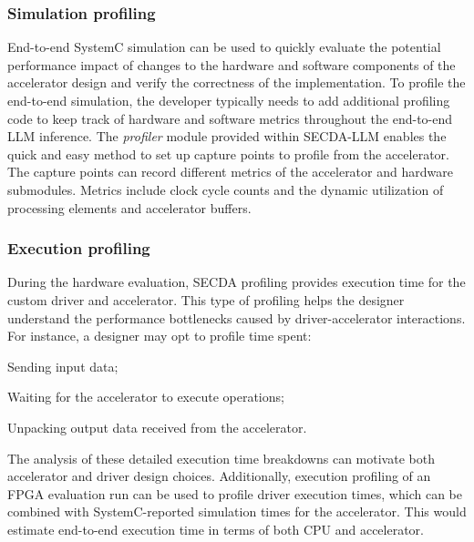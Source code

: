 \subsubsection{Simulation profiling}

End-to-end SystemC simulation can be used to quickly evaluate the potential performance impact of changes to the hardware and software components of the accelerator design and verify the correctness of the implementation.
To profile the end-to-end simulation, the developer typically needs to add additional profiling code to keep track of hardware and software metrics throughout the end-to-end LLM inference.
The \emph{profiler} module provided within SECDA-LLM enables the quick and easy method to set up capture points to profile from the accelerator.
The capture points can record different metrics of the accelerator and hardware submodules.
Metrics include clock cycle counts and the dynamic utilization of processing elements and accelerator buffers.


\subsubsection{Execution profiling}

During the hardware evaluation, SECDA profiling provides execution time for the custom driver and accelerator.
This type of profiling helps the designer understand the performance bottlenecks caused by driver-accelerator interactions.
For instance, a designer may opt to profile time spent:
\begin{enumerate*}[label=\roman*)]
    \item Sending input data;
    \item Waiting for the accelerator to execute operations;
    \item Unpacking output data received from the accelerator.
\end{enumerate*}
The analysis of these detailed execution time breakdowns can motivate both accelerator and driver design choices.
Additionally, execution profiling of an FPGA evaluation run can be used to profile driver execution times, which can be combined with SystemC-reported simulation times for the accelerator.
This would estimate end-to-end execution time in terms of both CPU and accelerator.




